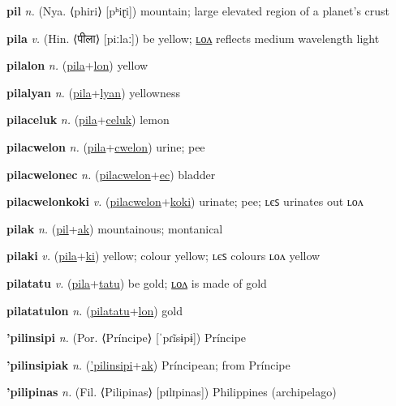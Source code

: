 \textbf{\hypertarget{pil}{pil}} \textit{n.} (Nya. ⟨phiri⟩ [pʰiɽi])
mountain; large elevated region of a planet’s crust

\textbf{\hypertarget{pila}{pila}} \textit{v.} (Hin. ⟨{\devanagari{}पीला}⟩ [piːlaː])
be yellow; \hyperlink{pilalon}{ʟᴏᴧ} reflects medium wavelength light

\textbf{\hypertarget{pilalon}{pilalon}} \textit{n.} (\hyperlink{pila}{pila}+\allowbreak \hyperlink{lon}{lon})
yellow

\textbf{\hypertarget{pilalyan}{pilalyan}} \textit{n.} (\hyperlink{pila}{pila}+\allowbreak \hyperlink{lyan}{lyan})
yellowness

\textbf{\hypertarget{pilaceluk}{pilaceluk}} \textit{n.} (\hyperlink{pila}{pila}+\allowbreak \hyperlink{celuk}{celuk})
lemon

\textbf{\hypertarget{pilacwelon}{pilacwelon}} \textit{n.} (\hyperlink{pila}{pila}+\allowbreak \hyperlink{cwelon}{cwelon})
urine; pee

\textbf{\hypertarget{pilacwelonec}{pilacwelonec}} \textit{n.} (\hyperlink{pilacwelon}{pilacwelon}+\allowbreak \hyperlink{ec}{ec})
bladder

\textbf{\hypertarget{pilacwelonkoki}{pilacwelonkoki}} \textit{v.} (\hyperlink{pilacwelon}{pilacwelon}+\allowbreak \hyperlink{koki}{koki})
urinate; pee; ʟєꜱ urinates out ʟᴏᴧ

\textbf{\hypertarget{pilak}{pilak}} \textit{n.} (\hyperlink{pil}{pil}+\allowbreak \hyperlink{ak}{ak})
mountainous; montanical

\textbf{\hypertarget{pilaki}{pilaki}} \textit{v.} (\hyperlink{pila}{pila}+\allowbreak \hyperlink{ki}{ki})
yellow; colour yellow; ʟєꜱ colours ʟᴏᴧ yellow

\textbf{\hypertarget{pilatatu}{pilatatu}} \textit{v.} (\hyperlink{pila}{pila}+\allowbreak \hyperlink{tatu}{tatu})
be gold; \hyperlink{pilatatulon}{ʟᴏᴧ} is made of gold

\textbf{\hypertarget{pilatatulon}{pilatatulon}} \textit{n.} (\hyperlink{pilatatu}{pilatatu}+\allowbreak \hyperlink{lon}{lon})
gold

\textbf{\hypertarget{'pilinsipi}{'pilinsipi}} \textit{n.} (Por. ⟨Príncipe⟩ [ˈpɾĩsɨpɨ])
Príncipe

\textbf{\hypertarget{'pilinsipiak}{'pilinsipiak}} \textit{n.} (\hyperlink{'pilinsipi}{'pilinsipi}+\allowbreak \hyperlink{ak}{ak})
Príncipean; from Príncipe

\textbf{\hypertarget{'pilipinas}{'pilipinas}} \textit{n.} (Fil. ⟨Pilipinas⟩ [pɪlɪpinas])
Philippines (archipelago)

